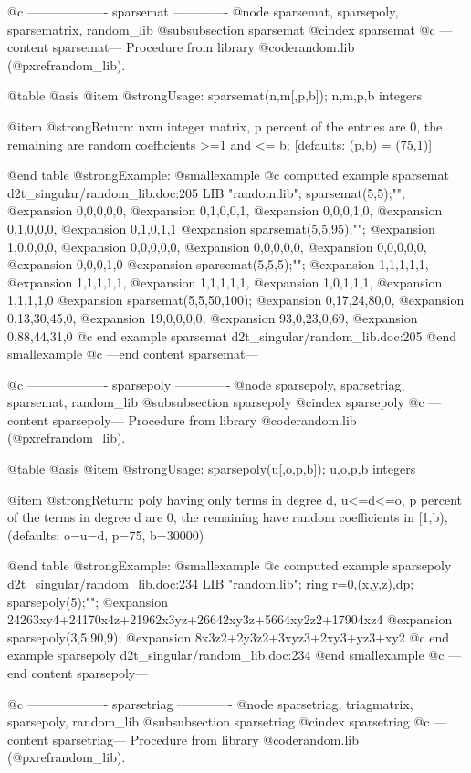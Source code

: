 @c ------------------- sparsemat -------------
@node sparsemat, sparsepoly, sparsematrix, random_lib
@subsubsection sparsemat
@cindex sparsemat
@c ---content sparsemat---
Procedure from library @code{random.lib} (@pxref{random_lib}).

@table @asis
@item @strong{Usage:}
sparsemat(n,m[,p,b]); n,m,p,b integers

@item @strong{Return:}
nxm integer matrix, p percent of the entries are 0, the remaining
are random coefficients >=1 and <= b; [defaults: (p,b) = (75,1)]

@end table
@strong{Example:}
@smallexample
@c computed example sparsemat d2t_singular/random_lib.doc:205 
LIB "random.lib";
sparsemat(5,5);"";
@expansion{} 0,0,0,0,0,
@expansion{} 0,1,0,0,1,
@expansion{} 0,0,0,1,0,
@expansion{} 0,1,0,0,0,
@expansion{} 0,1,0,1,1 
@expansion{} 
sparsemat(5,5,95);"";
@expansion{} 1,0,0,0,0,
@expansion{} 0,0,0,0,0,
@expansion{} 0,0,0,0,0,
@expansion{} 0,0,0,0,0,
@expansion{} 0,0,0,1,0 
@expansion{} 
sparsemat(5,5,5);"";
@expansion{} 1,1,1,1,1,
@expansion{} 1,1,1,1,1,
@expansion{} 1,1,1,1,1,
@expansion{} 1,0,1,1,1,
@expansion{} 1,1,1,1,0 
@expansion{} 
sparsemat(5,5,50,100);
@expansion{} 0,17,24,80,0,
@expansion{} 0,13,30,45,0,
@expansion{} 19,0,0,0,0,
@expansion{} 93,0,23,0,69,
@expansion{} 0,88,44,31,0 
@c end example sparsemat d2t_singular/random_lib.doc:205
@end smallexample
@c ---end content sparsemat---

@c ------------------- sparsepoly -------------
@node sparsepoly, sparsetriag, sparsemat, random_lib
@subsubsection sparsepoly
@cindex sparsepoly
@c ---content sparsepoly---
Procedure from library @code{random.lib} (@pxref{random_lib}).

@table @asis
@item @strong{Usage:}
sparsepoly(u[,o,p,b]); u,o,p,b integers

@item @strong{Return:}
poly having only terms in degree d, u<=d<=o, p percent of the terms
in degree d are 0, the remaining have random coefficients in [1,b),
(defaults: o=u=d, p=75, b=30000)

@end table
@strong{Example:}
@smallexample
@c computed example sparsepoly d2t_singular/random_lib.doc:234 
LIB "random.lib";
ring r=0,(x,y,z),dp;
sparsepoly(5);"";
@expansion{} 24263xy4+24170x4z+21962x3yz+26642xy3z+5664xy2z2+17904xz4
@expansion{} 
sparsepoly(3,5,90,9);
@expansion{} 8x3z2+2y3z2+3xyz3+2xy3+yz3+xy2
@c end example sparsepoly d2t_singular/random_lib.doc:234
@end smallexample
@c ---end content sparsepoly---

@c ------------------- sparsetriag -------------
@node sparsetriag, triagmatrix, sparsepoly, random_lib
@subsubsection sparsetriag
@cindex sparsetriag
@c ---content sparsetriag---
Procedure from library @code{random.lib} (@pxref{random_lib}).


